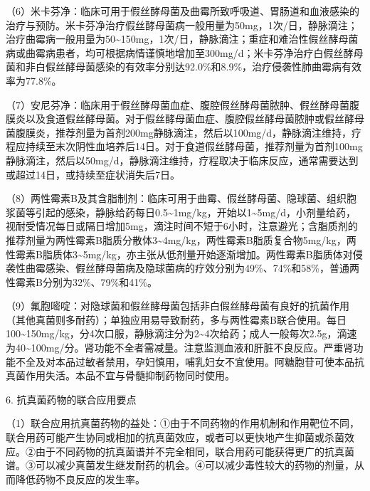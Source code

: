 （6）米卡芬净：临床可用于假丝酵母菌及曲霉所致呼吸道、胃肠道和血液感染的治疗与预防。米卡芬净治疗假丝酵母菌病一般用量为50mg，1次/日，静脉滴注；治疗曲霉病一般用量为50\textasciitilde{}150mg，1次/日，静脉滴注；重症和难治性假丝酵母菌病或曲霉病患者，均可根据病情谨慎地增加至300mg/d；米卡芬净治疗白假丝酵母菌和非白假丝酵母菌感染的有效率分别达92.0\%和8.9\%，治疗侵袭性肺曲霉病有效率为77.8\%。

（7）安尼芬净：临床用于假丝酵母菌血症、腹腔假丝酵母菌脓肿、假丝酵母菌腹膜炎以及食道假丝酵母菌。对于假丝酵母菌血症、腹腔假丝酵母菌脓肿或假丝酵母菌腹膜炎，推荐剂量为首剂200mg静脉滴注，然后以100mg/d，静脉滴注维持，疗程应持续至末次阴性血培养后14日。对于食道假丝酵母菌，推荐剂量为首剂100mg静脉滴注，然后以50mg/d，静脉滴注维持，疗程取决于临床反应，通常需要达到或超过14日，或持续至症状消失后7日。

（8）两性霉素B及其含脂制剂：临床可用于曲霉、假丝酵母菌、隐球菌、组织胞浆菌等引起的感染，静脉给药每日0.5\textasciitilde{}1mg/kg，开始以1\textasciitilde{}5mg/d，小剂量给药，视耐受情况每日或隔日增加5mg，滴注时间不短于6小时，注意避光；含脂质剂的推荐剂量为两性霉素B脂质分散体3\textasciitilde{}4mg/kg，两性霉素B脂质复合物5mg/kg，两性霉素B脂质体3\textasciitilde{}5mg/kg，亦主张从低剂量开始逐渐增加。两性霉素B脂质体对侵袭性曲霉感染、假丝酵母菌病及隐球菌病的疗效分别为49\%、74\%和58\%，普通两性霉素B分别为32\%、79\%和41\%。

（9）氟胞嘧啶：对隐球菌和假丝酵母菌包括非白假丝酵母菌有良好的抗菌作用（其他真菌则多耐药）；单独应用易导致耐药，多与两性霉素B联合使用。每日100\textasciitilde{}150mg/kg，分4次口服，静脉滴注分为2\textasciitilde{}4次给药；成人一般每次2.5g，滴速为40\textasciitilde{}100mg/分。肾功能不全者需减量。注意监测血液和肝脏不良反应。严重肾功能不全及对本品过敏者禁用，孕妇慎用，哺乳妇女不宜使用。阿糖胞苷可使本品抗真菌作用失活。本品不宜与骨髓抑制药物同时使用。

6. 抗真菌药物的联合应用要点

（1）联合应用抗真菌药物的益处：①由于不同药物的作用机制和作用靶位不同，联合用药可能产生协同或相加的抗真菌效应，或者可以更快地产生抑菌或杀菌效应。②由于不同药物的抗真菌谱并不完全相同，联合用药可能获得更广的抗真菌谱。③可以减少真菌发生继发耐药的机会。④可以减少毒性较大的药物的剂量，从而降低药物不良反应的发生率。

